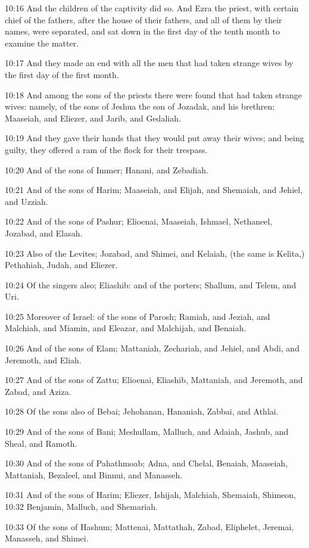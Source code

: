 10:16 And the children of the captivity did so. And Ezra the priest, with certain chief of the fathers, after the house of their fathers, and all of them by their names, were separated, and sat down in the first day of the tenth month to examine the matter.

10:17 And they made an end with all the men that had taken strange wives by the first day of the first month.

10:18 And among the sons of the priests there were found that had taken strange wives: namely, of the sons of Jeshua the son of Jozadak, and his brethren; Maaseiah, and Eliezer, and Jarib, and Gedaliah.

10:19 And they gave their hands that they would put away their wives; and being guilty, they offered a ram of the flock for their trespass.

10:20 And of the sons of Immer; Hanani, and Zebadiah.

10:21 And of the sons of Harim; Maaseiah, and Elijah, and Shemaiah, and Jehiel, and Uzziah.

10:22 And of the sons of Pashur; Elioenai, Maaseiah, Ishmael, Nethaneel, Jozabad, and Elasah.

10:23 Also of the Levites; Jozabad, and Shimei, and Kelaiah, (the same is Kelita,) Pethahiah, Judah, and Eliezer.

10:24 Of the singers also; Eliashib: and of the porters; Shallum, and Telem, and Uri.

10:25 Moreover of Israel: of the sons of Parosh; Ramiah, and Jeziah, and Malchiah, and Miamin, and Eleazar, and Malchijah, and Benaiah.

10:26 And of the sons of Elam; Mattaniah, Zechariah, and Jehiel, and Abdi, and Jeremoth, and Eliah.

10:27 And of the sons of Zattu; Elioenai, Eliashib, Mattaniah, and Jeremoth, and Zabad, and Aziza.

10:28 Of the sons also of Bebai; Jehohanan, Hananiah, Zabbai, and Athlai.

10:29 And of the sons of Bani; Meshullam, Malluch, and Adaiah, Jashub, and Sheal, and Ramoth.

10:30 And of the sons of Pahathmoab; Adna, and Chelal, Benaiah, Maaseiah, Mattaniah, Bezaleel, and Binnui, and Manasseh.

10:31 And of the sons of Harim; Eliezer, Ishijah, Malchiah, Shemaiah, Shimeon, 10:32 Benjamin, Malluch, and Shemariah.

10:33 Of the sons of Hashum; Mattenai, Mattathah, Zabad, Eliphelet, Jeremai, Manasseh, and Shimei.

